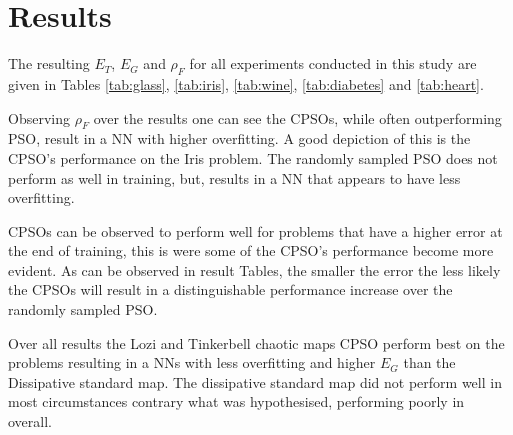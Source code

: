 \documentclass[conference]{IEEEtran}
\begin{document}
\section{Results}

The resulting $ E_T $, $ E_G $ and $ \rho_F $ for all experiments conducted in this study are given in Tables \ref{tab:glass}, \ref{tab:iris}, \ref{tab:wine}, \ref{tab:diabetes} and \ref{tab:heart}.

Observing $ \rho_F $ over the results one can see the \ac{CPSO}s, while often outperforming \ac{PSO}, result in a \ac{NN} with higher overfitting. A good depiction of this is the \ac{CPSO}'s performance on the Iris problem. The randomly sampled \ac{PSO} does not perform as well in training, but, results in a \ac{NN} that appears to have less overfitting.

\ac{CPSO}s can be observed to perform well for problems that have a higher error at the end of training, this is were some of the \ac{CPSO}'s performance become more evident. As can be observed in result Tables, the smaller the error the less likely the \ac{CPSO}s will result in a distinguishable performance increase over the randomly sampled \ac{PSO}.

Over all results the Lozi and Tinkerbell chaotic maps \ac{CPSO} perform best on the problems resulting in a \ac{NN}s with less overfitting and higher $ E_G $ than the Dissipative standard map. The dissipative standard map did not perform well in most circumstances contrary what was hypothesised, performing poorly in overall.
\end{document}
